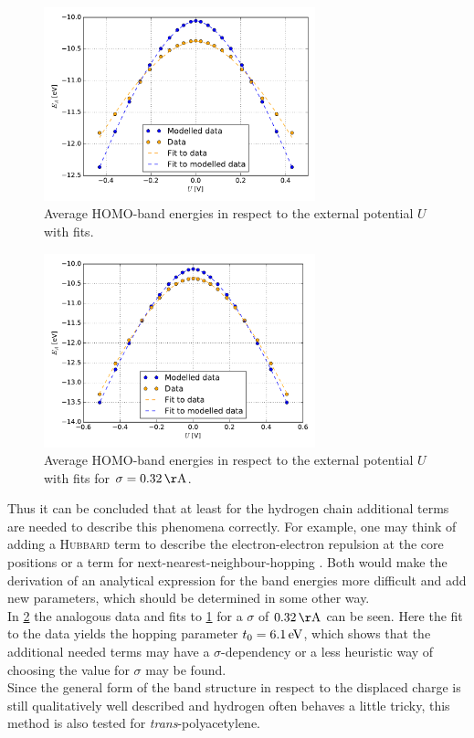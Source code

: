 \begin{figure}[]
	\centering
	\includegraphics[width = 0.7\textwidth]{Images/Hydrogen/charging/Homo_energy_charge}
	\caption{Average HOMO-band energies in respect to the external potential $U$ with fits.}
	\label{image_hydrogen_homo_energy_charging}
\end{figure}
\begin{figure}[]
	\centering
	\includegraphics[width = 0.7\textwidth]{Images/Hydrogen/charging/Homo_energy_charge_sigma_32}
	\caption{Average HOMO-band energies in respect to the external potential $U$ with fits for $\sigma = \unit[0.32]{\AA}$.}
	\label{image_hydrogen_homo_energy_charging_sigma_32}
\end{figure}
Thus it can be concluded that at least for the hydrogen chain additional terms are needed to describe this phenomena correctly. For example, one may think of adding a \textsc{Hubbard} term to describe the electron-electron repulsion at the core positions or a term for next-nearest-neighbour-hopping \cite{PhysRevLett.103.067004,PhysRevB.82.155141}. Both would make the derivation of an analytical expression for the band energies more difficult and add new parameters, which should be determined in some other way.\\ In \cref{image_hydrogen_homo_energy_charging_sigma_32} the analogous data and fits to \cref{image_hydrogen_homo_energy_charging} for a $\sigma$ of $\unit[0.32]{\AA}$ can be seen. Here the fit to the data yields the hopping parameter $t_0 = \unit[6.1]{eV}$, which shows that the additional needed terms may have a $\sigma$-dependency or a less heuristic way of choosing the value for $\sigma$ may be found.\\
Since the general form of the band structure in respect to the displaced charge is still qualitatively well described and hydrogen often behaves a little tricky, this method is also tested for \emph{trans}-polyacetylene.
